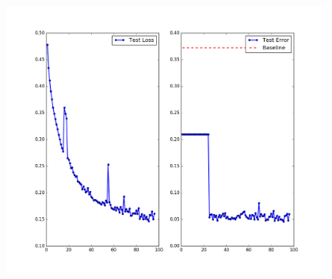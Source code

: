 \documentclass{article}
\begin{document}
\begin{flushleft}
\begin{figure}[H]
\begin{minipage}{0.49\linewidth}
\includegraphics[width=0.95\textwidth]{Test-Statistics-sgd-batchsize=100-bce.png}
\end{minipage}
\end{figure}
\end{flushleft}
\end{document}
